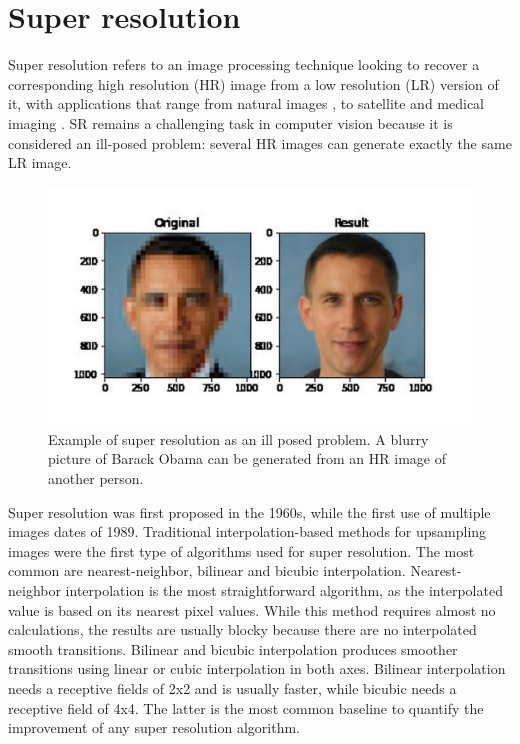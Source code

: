 \section{Super resolution} \label{sec:SR}

    Super resolution refers to an image processing technique looking to recover a corresponding high resolution (HR) image from a low resolution (LR) version of it, with applications that range from natural images \cite{zeyde2010single}, \cite{martin2001database} to satellite \cite{valsesia2021permutation} and medical imaging \cite{bashir2021comprehensive}. SR remains a challenging task in computer vision because it is considered an ill-posed problem: several HR images can generate exactly the same LR image. 

       \begin{figure}[H]
            \centering
            \includegraphics[width=\textwidth]{Includes/2-SR-ill-posed.jpg}
            \caption{Example of super resolution as an ill posed problem. A blurry picture of Barack Obama can be generated from an HR image of another person.}
            \label{fig:2-SR-ill-posed}
        \end{figure}
    
    Super resolution was first proposed in the 1960s, while the first use of multiple images dates of 1989. 
    Traditional interpolation-based methods for upsampling images were the first type of algorithms used for super resolution.
    The most common are nearest-neighbor, bilinear and bicubic interpolation.
    Nearest-neighbor interpolation is the most straightforward algorithm, as the interpolated value is based on its nearest pixel values. 
    While this method requires almost no calculations, the results are usually blocky because there are no interpolated smooth transitions.
    Bilinear and bicubic interpolation produces smoother transitions using linear or cubic interpolation in both axes. 
    Bilinear interpolation needs a receptive fields of 2x2 and is usually faster, while bicubic needs a receptive field of 4x4. 
    The latter is the most common baseline to quantify the improvement of any super resolution algorithm. 

